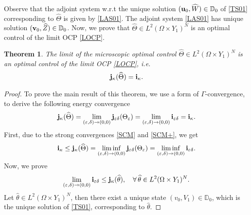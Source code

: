 \documentclass[11pt,a4paper]{article}
\numberwithin{equation}{section}
\def\O{\Omega}
\def\d{\delta}
\def\e{\varepsilon}
\def\D{{\mathbb{D}}}
\def\ed{{\varepsilon\delta}}
\def\wh{\widehat }
\def\X{\times }
\def\Gi{{\bf i}}
\def\Gj{{\bf j}}
\def\Gu{{\bf u}}
\def\Gv{{\bf v}}
\newtheorem{theorem}{Theorem}[section]
\begin{document}
	Observe that the adjoint system w.r.t the unique solution $(\Gu_0,\wh W)\in\D_0$ of \eqref{TS01} corresponding to $\wh\Theta$ is given by \eqref{LAS01}. The adjoint system \eqref{LAS01} has unique solution $(\Gv_0,\wh Z)\in\D_0$. Now, we prove that $\wh \Theta\in L^2(\O\X Y_1)^N$ is an optimal control of the limit OCP \eqref{LOCP}.
	\begin{theorem}
		The limit of the microscopic optimal control $\wh\Theta\in L^2(\O\X Y_1)^N$ is an optimal control of the limit OCP \eqref{LOCP}, i.e.
		$$\Gj_\kappa(\wh\Theta)=\Gi_\kappa.$$
	\end{theorem} 
	\begin{proof}
		To prove the main result of this theorem, we use a form of $\Gamma$-convergence, to derive the following energy convergence
		\begin{equation}\label{LM}
			\Gj_\kappa(\wh \Theta)=\lim_{(\e,\d)\to(0,0)}\Gj_\ed(\Theta_\e)=\lim_{(\e,\d)\to(0,0)}\Gi_\ed=\Gi_\kappa.
		\end{equation}
		First, due to the strong convergences \eqref{SCM} and \eqref{SCM+}, we get
		\begin{equation}\label{LI}
			\Gi_\kappa\leq \Gj_\kappa(\wh\Theta)=\liminf_{(\e,\d)\to(0,0)}\Gj_\ed(\Theta_\e)=\liminf_{(\e,\d)\to(0,0)}\Gi_\ed.
		\end{equation}
		Now, we prove
		\begin{equation}\label{LS}
			\lim_{(\e,\d)\to(0,0)}\Gi_\ed\leq \Gj_\kappa(\wh \theta),\quad \forall\,\wh \theta\in L^2(\O\X Y_1)^N.
		\end{equation}
		Let $\wh \theta\in L^2(\O\X Y_1)^N$, then there exist a unique state $(v_0,V_1)\in\D_0$, which is the unique solution of \eqref{TS01}, corresponding to $\wh\theta$. 
		

\end{proof}
\end{document}

